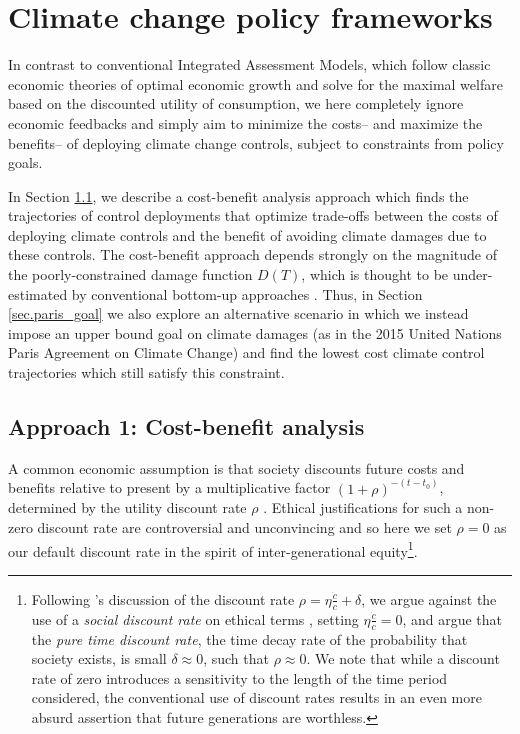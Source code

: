 \documentclass{article}
\begin{document}
\section{Climate change policy frameworks}\label{sec.policy_frameworks}

In contrast to conventional Integrated Assessment Models, which follow classic economic theories of optimal economic growth and solve for the maximal welfare based on the discounted utility of consumption, we here completely ignore economic feedbacks and simply aim to minimize the costs– and maximize the benefits– of deploying climate change controls, subject to constraints from policy goals.

In Section \ref{sec.cost_benefit}, we describe a cost-benefit analysis approach which finds the trajectories of control deployments that optimize trade-offs between the costs of deploying climate controls and the benefit of avoiding climate damages due to these controls. The cost-benefit approach depends strongly on the magnitude of the poorly-constrained damage function $D(T)$, which is thought to be under-estimated by conventional bottom-up approaches \citep{ackerman_limitations_2009}. Thus, in Section \ref{sec.paris_goal} we also explore an alternative scenario in which we instead impose an upper bound goal on climate damages (as in the 2015 United Nations Paris Agreement on Climate Change) and find the lowest cost climate control trajectories which still satisfy this constraint.

\subsection{Approach 1: Cost-benefit analysis}\label{sec.cost_benefit}

A common economic assumption is that society discounts future costs and benefits relative to present by a multiplicative factor $(1 + \rho)^{-(t-t_{0})}$, determined by the utility discount rate $\rho$ \citep[e.g. see reviews in][]{broome_discounting_1994, stern_economics_2007}. Ethical justifications for such a non-zero discount rate are controversial and unconvincing \citep{ramsey_mathematical_1928, solow_economics_1974, stern_economics_2007} and so here we set $\rho = 0$ as our default discount rate in the spirit of inter-generational equity\footnote{Following \cite{stern_economics_2007}'s discussion of the discount rate $\rho = \eta \frac{\dot{c}}{c} + \delta$, we argue against the use of a \textit{social discount rate} on ethical terms \citep{ramsey_mathematical_1928, solow_economics_1974}, setting $\eta \frac{\dot{c}}{c}=0$, and argue that the \textit{pure time discount rate}, the time decay rate of the probability that society exists, is small $\delta \approx 0$, such that $\rho \approx 0$. We note that while a discount rate of zero introduces a sensitivity to the length of the time period considered, the conventional use of discount rates results in an even more absurd assertion that future generations are worthless.}. 
\end{document}
